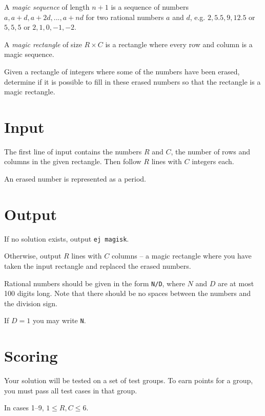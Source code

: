 
A \emph{magic sequence} of length $n + 1$ is a sequence of numbers $a, a + d, a + 2d, ..., a + nd$ for two rational numbers $a$ and $d$, e.g. $2, 5.5, 9, 12.5$ or $5, 5, 5$ or $2, 1, 0, -1, -2$.

A \emph{magic rectangle} of size $R \times C$ is a rectangle where every row and column is a magic sequence.

Given a rectangle of integers where some of the numbers have been erased, determine if it is possible to fill in these erased numbers so that the rectangle is a magic rectangle.

\section*{Input}
The first line of input contains the numbers $R$ and $C$, the number of rows and columns in the given rectangle. Then follow $R$ lines with $C$ integers each.

An erased number is represented as a period.

\section*{Output}
If no solution exists, output \texttt{ej magisk}.

Otherwise, output $R$ lines with $C$ columns -- a magic rectangle where you have taken the input rectangle and replaced the erased numbers.

Rational numbers should be given in the form \texttt{N/D}, where $N$ and $D$ are at most 100 digits long. Note that there should be no spaces between the numbers and the division sign.

If $D = 1$ you may write \texttt{N}.

\section*{Scoring}
Your solution will be tested on a set of test groups.
To earn points for a group, you must pass all test cases in that group.

In cases 1--9, $1 \le R, C \le 6$.

